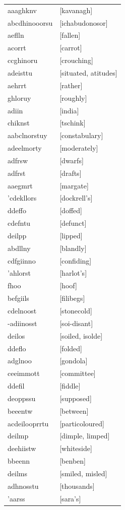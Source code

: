 \documentclass{article}
\begin{document}
\begin{tabular}{ll}
aaaghknv & [kavanagh] \\
abcdhinooorsu & [ichabudonosor] \\
aeflln & [fallen] \\
acorrt & [carrot] \\
ccghinoru & [crouching] \\
adeisttu & [situated, atitudes] \\
aehrrt & [rather] \\
ghloruy & [roughly] \\
adiin & [india] \\
chiknst & [tschink] \\
aabclnorstuy & [constabulary] \\
adeelmorty & [moderately] \\
adfrsw & [dwarfs] \\
adfrst & [drafts] \\
aaegmrt & [margate] \\
'cdekllors & [dockrell's] \\
ddeffo & [doffed] \\
cdefntu & [defunct] \\
deilpp & [lipped] \\
abdllny & [blandly] \\
cdfgiinno & [confiding] \\
'ahlorst & [harlot's] \\
fhoo & [hoof] \\
befgiils & [filibegs] \\
cdelnoost & [stonecold] \\
-adiinosst & [soi-disant] \\
deilos & [soiled, isolde] \\
ddeflo & [folded] \\
adglnoo & [gondola] \\
ceeimmott & [committee] \\
ddefil & [fiddle] \\
deoppssu & [supposed] \\
beeentw & [between] \\
acdeilooprrtu & [particoloured] \\
deilmp & [dimple, limped] \\
deehiistw & [whiteside] \\
bbeenn & [benben] \\
deilms & [smiled, misled] \\
adhnosstu & [thousands] \\
'aarss & [sara's] \\

\end{tabular}
\end{document}
